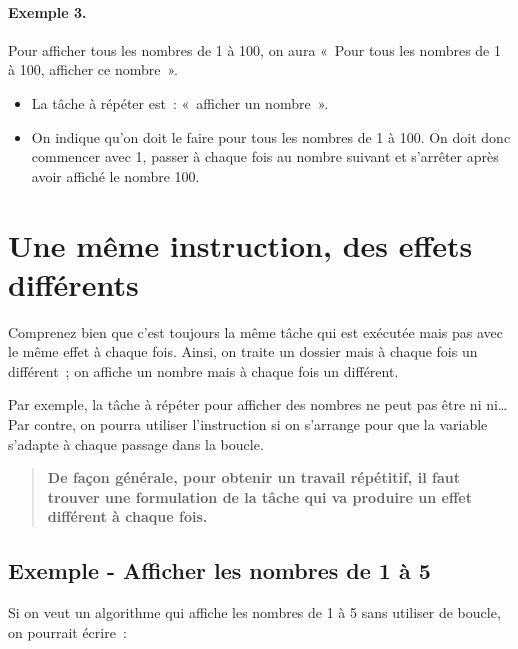 	\paragraph{Exemple 3.}
	Pour afficher tous les nombres de 1 à 100, on aura
	«~Pour tous les nombres de 1 à 100, afficher ce nombre~».
	\begin{itemize}
	\item
		La tâche à répéter est~: «~afficher un nombre~».
	\item 
		On indique qu’on doit le faire pour tous les nombres de 1 à 100. 
		On doit donc commencer avec 1, 
		passer à chaque fois au nombre suivant 
		et s’arrêter après avoir affiché le nombre 100.
	\end{itemize}
		
\section{Une même instruction, des effets différents}

	Comprenez bien que c’est toujours la même tâche qui est exécutée 
	mais pas avec le même effet à chaque fois. 
	Ainsi, on traite un dossier mais à chaque fois un différent~; 
	on affiche un nombre mais à chaque fois un différent. 
	
	Par exemple, la tâche à répéter pour afficher des nombres
	ne peut pas être
	 ni  ni\dots{}
	Par contre, on pourra utiliser l’instruction
	 si on s’arrange pour que la variable
	 s’adapte à chaque passage dans la boucle.

	\begin{quote}
		\bfseries
		De façon générale,
		pour obtenir un travail répétitif,
		il faut trouver une formulation de la tâche
		qui va produire un effet différent à chaque fois.
	\end{quote}
	
	\subsection{Exemple - Afficher les nombres de 1 à 5}
	
		Si on veut un algorithme qui affiche les nombres de 1 à 5
		sans utiliser de boucle, on pourrait écrire~:
		
		\begin{LDA}
		\end{LDA}
		
